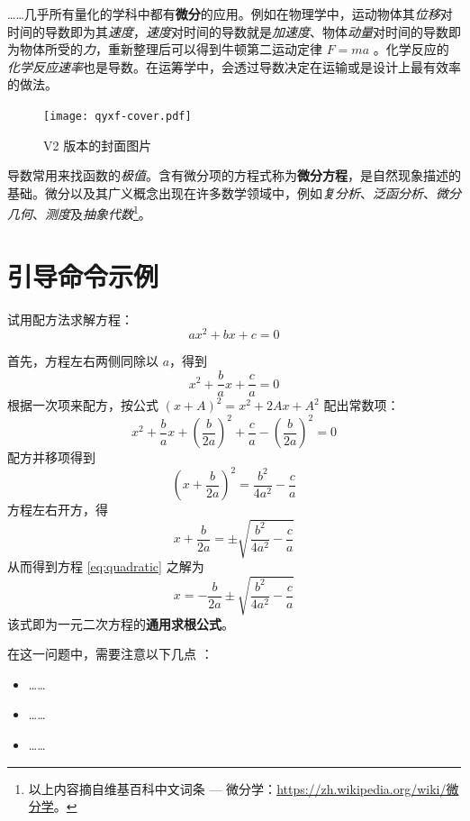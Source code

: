\documentclass[
  10pt,
  twoside,
  openany,
  b5paper, %
  colorscheme = bootstrap-v4, %
]{qyxf-book}
\numberwithin{equation}{section}
\begin{document}
……几乎所有量化的学科中都有\textbf{微分}的应用。例如在物理学中，运动物体其\emph{位移}对时间的导数即为其\emph{速度}，\emph{速度}对时间的导数就是\emph{加速度}、物体\emph{动量}对时间的导数即为物体所受的\emph{力}，重新整理后可以得到牛顿第二运动定律 $F=ma$ 。化学反应的\emph{化学反应速率}也是导数。在运筹学中，会透过导数决定在运输或是设计上最有效率的做法。

\begin{figure}[htbp]
  \centering
  \texttt{[image: qyxf-cover.pdf]}
  \caption{V2 版本的封面图片}
  \label{fig:qyxf-logo}
\end{figure}

导数常用来找函数的\emph{极值}。含有微分项的方程式称为\textbf{微分方程}，是自然现象描述的基础。微分以及其广义概念出现在许多数学领域中，例如\emph{复分析}、\emph{泛函分析}、\emph{微分几何}、\emph{测度}及\emph{抽象代数}\footnote{以上内容摘自维基百科中文词条 --- 微分学：\url{https://zh.wikipedia.org/wiki/微分学}。}。

\section{引导命令示例}

 试用配方法求解方程：
\begin{equation}\label{eq:quadratic}
  ax^2 + bx + c = 0
\end{equation}

\solve 首先，方程左右两侧同除以 $a$，得到
\[ x^2 + \frac bax + \frac ca = 0 \]
根据一次项来配方，按公式 $(x+A)^2=x^2+2Ax+A^2$ 配出常数项：
\[ x^2 + \frac bax + \left(\frac b{2a}\right)^2 + \frac ca - \left(\frac b{2a}\right)^2 = 0 \]
配方并移项得到
\[ \left(x + \frac b{2a}\right)^2 = \frac {b^2}{4a^2} - \frac ca \]
方程左右开方，得
\[ x + \frac b{2a} = \pm \sqrt{\frac {b^2}{4a^2} - \frac ca} \]
从而得到方程 \eqref{eq:quadratic} 之解为
\begin{equation}
  x = - \frac b{2a} \pm \sqrt{\frac {b^2}{4a^2} - \frac ca}
\end{equation}
该式即为一元二次方程的\textbf{通用求根公式}。


\analysis 在这一问题中，需要注意以下几点 \cite{texbook,latex}：
\begin{itemize}
  \item ……
  \item ……
  \item ……
\end{itemize}

\end{document}
